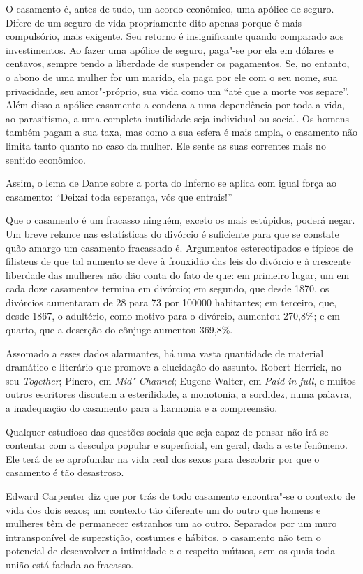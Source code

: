 O casamento é, antes de tudo, um acordo econômico, uma apólice de
seguro. Difere de um seguro de vida propriamente dito apenas porque é
mais compulsório, mais exigente. Seu retorno é insignificante quando
comparado aos investimentos. Ao fazer uma apólice de seguro, paga"-se por
ela em dólares e centavos, sempre tendo a liberdade de suspender os
pagamentos. Se, no entanto, o abono de uma mulher for um marido, ela
paga por ele com o seu nome, sua privacidade, seu amor"-próprio, sua vida
como um ``até que a morte vos separe''. Além disso a apólice
casamento a condena a uma dependência por toda a vida, ao parasitismo, a
uma completa inutilidade seja individual ou social. Os homens também
pagam a sua taxa, mas como a sua esfera é mais ampla, o casamento não
limita tanto quanto no caso da mulher. Ele sente as suas correntes mais
no sentido econômico.

Assim, o lema de Dante sobre a porta do Inferno se aplica com igual força
ao casamento: ``Deixai toda esperança, vós que entrais!''

Que o casamento é um fracasso ninguém, exceto os mais
estúpidos, poderá negar. Um breve relance nas estatísticas do divórcio é
suficiente para que se constate quão amargo um casamento fracassado é. Argumentos
estereotipados e típicos de filisteus de que tal aumento se deve à frouxidão
das leis do divórcio e à crescente liberdade das mulheres não dão conta
do fato de que: em primeiro lugar, um em cada doze casamentos termina em
divórcio; em segundo, que desde 1870, os divórcios aumentaram de 28 para
73 por 100000 habitantes; em terceiro, que, desde 1867, o adultério,
como motivo para o divórcio, aumentou 270,8\%; e em quarto, que a
deserção do cônjuge aumentou 369,8\%.

Assomado a esses dados alarmantes, há uma vasta quantidade de material
dramático e literário que promove a elucidação do assunto. Robert
Herrick, no seu \emph{Together}; Pinero, em \emph{Mid"-Channel}; Eugene
Walter, em \emph{Paid in full}, e muitos outros escritores discutem a
esterilidade, a monotonia, a sordidez, numa palavra, a inadequação do
casamento para a harmonia e a compreensão.

Qualquer estudioso das questões sociais que seja capaz de pensar não irá
se contentar com a desculpa popular e superficial, em geral, dada a este fenômeno. Ele
terá de se aprofundar na vida real dos sexos para descobrir por que o
casamento é tão desastroso.

Edward Carpenter diz que por trás de todo casamento encontra"-se o
contexto de vida dos dois sexos; um contexto tão diferente um do outro
que homens e mulheres têm de permanecer estranhos um ao outro.
Separados por um muro intransponível de superstição, costumes e hábitos,
o casamento não tem o potencial de desenvolver a intimidade e o
respeito mútuos, sem os quais toda união está fadada ao fracasso.

